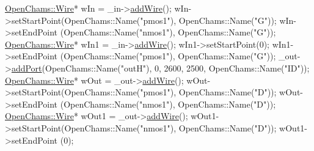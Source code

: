 \begin{DoxyCodeInclude}
    \mbox{\hyperlink{class_open_chams_1_1_wire}{OpenChams::Wire}}* wIn = \_in->\mbox{\hyperlink{class_open_chams_1_1_net_a643a969f62770301b8b70ed63c36a55e}{addWire}}();
    wIn->setStartPoint(OpenChams::Name(\textcolor{stringliteral}{"pmos1"}), OpenChams::Name(\textcolor{stringliteral}{"G"}));
    wIn->setEndPoint  (OpenChams::Name(\textcolor{stringliteral}{"nmos1"}), OpenChams::Name(\textcolor{stringliteral}{"G"}));
    \mbox{\hyperlink{class_open_chams_1_1_wire}{OpenChams::Wire}}* wIn1 = \_in->\mbox{\hyperlink{class_open_chams_1_1_net_a643a969f62770301b8b70ed63c36a55e}{addWire}}();
    wIn1->setStartPoint(0);
    wIn1->setEndPoint (OpenChams::Name(\textcolor{stringliteral}{"pmos1"}), OpenChams::Name(\textcolor{stringliteral}{"G"}));
    \_out->\mbox{\hyperlink{class_open_chams_1_1_net_af395a7c9d6f3c2b24500b91260873664}{addPort}}(OpenChams::Name(\textcolor{stringliteral}{"outH"}), 0, 2600, 2500, OpenChams::Name(\textcolor{stringliteral}{"ID"}));
    \mbox{\hyperlink{class_open_chams_1_1_wire}{OpenChams::Wire}}* wOut = \_out->\mbox{\hyperlink{class_open_chams_1_1_net_a643a969f62770301b8b70ed63c36a55e}{addWire}}();
    wOut->setStartPoint(OpenChams::Name(\textcolor{stringliteral}{"pmos1"}), OpenChams::Name(\textcolor{stringliteral}{"D"}));
    wOut->setEndPoint  (OpenChams::Name(\textcolor{stringliteral}{"nmos1"}), OpenChams::Name(\textcolor{stringliteral}{"D"}));
    \mbox{\hyperlink{class_open_chams_1_1_wire}{OpenChams::Wire}}* wOut1 = \_out->\mbox{\hyperlink{class_open_chams_1_1_net_a643a969f62770301b8b70ed63c36a55e}{addWire}}();
    wOut1->setStartPoint(OpenChams::Name(\textcolor{stringliteral}{"nmos1"}), OpenChams::Name(\textcolor{stringliteral}{"D"}));
    wOut1->setEndPoint  (0);


\end{DoxyCodeInclude}
